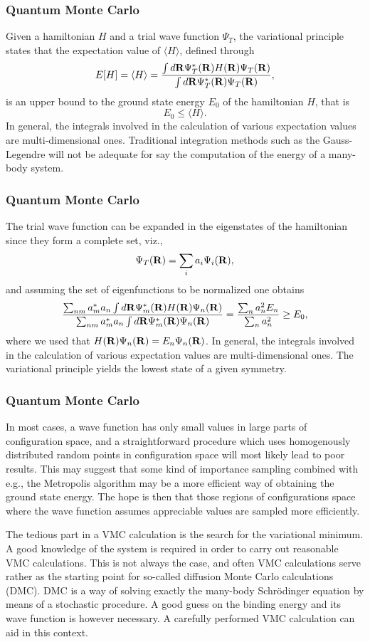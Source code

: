 \documentclass[compress]{beamer}
\begin{document}
\frame
{
  \frametitle{Quantum Monte Carlo}
\begin{small}
{\scriptsize
Given a hamiltonian $H$ and a trial
wave function $\Psi_T$, the variational principle states that
the expectation value of $\langle H \rangle$, defined through 
\[
   E[H]= \langle H \rangle =
   \frac{\int d{\bf R}\Psi^{\ast}_T({\bf R})H({\bf R})\Psi_T({\bf R})}
        {\int d{\bf R}\Psi^{\ast}_T({\bf R})\Psi_T({\bf R})},
\]
is an upper bound to the ground state energy $E_0$ of the hamiltonian $H$, that
is 
\[
    E_0 \le \langle H \rangle .
\]
In general, the integrals involved in the calculation of various  expectation
values  are multi-dimensional ones. Traditional integration methods
such as the Gauss-Legendre will not be adequate for say the 
computation of the energy of a many-body system.
}
\end{small}
}


\frame
{
  \frametitle{Quantum Monte Carlo}
\begin{small}
{\scriptsize
The trial wave function can be expanded
in the eigenstates of the hamiltonian since they form a complete set, viz.,
\[
   \Psi_T({\bf R})=\sum_i a_i\Psi_i({\bf R}),
\]
and assuming the set of eigenfunctions to be normalized one obtains 
\[
     \frac{\sum_{nm}a^*_ma_n \int d{\bf R}\Psi^{\ast}_m({\bf R})H({\bf R})\Psi_n({\bf R})}
        {\sum_{nm}a^*_ma_n \int d{\bf R}\Psi^{\ast}_m({\bf R})\Psi_n({\bf R})} =\frac{\sum_{n}a^2_n E_n}
        {\sum_{n}a^2_n} \ge E_0,
\]
where we used that $H({\bf R})\Psi_n({\bf R})=E_n\Psi_n({\bf R})$.
In general, the integrals involved in the calculation of various  expectation
values  are multi-dimensional ones. 
The variational principle yields the lowest state of a given symmetry.
}
\end{small}
}


\frame
{
  \frametitle{Quantum Monte Carlo}
\begin{small}
{\scriptsize
In most cases, a wave function has only small values in large parts of 
configuration space, and a straightforward procedure which uses
homogenously distributed random points in configuration space 
will most likely lead to poor results. This may suggest that some kind
of importance sampling combined with e.g., the Metropolis algorithm 
may be  a more efficient way of obtaining the ground state energy.
The hope is then that those regions of configurations space where
the wave function assumes appreciable values are sampled more 
efficiently. 

The tedious part in a VMC calculation is the search for the variational
minimum. A good knowledge of the system is required in order to carry out
reasonable VMC calculations. This is not always the case, 
and often VMC calculations 
serve rather as the starting
point for so-called diffusion Monte Carlo calculations (DMC). DMC is a way of
solving exactly the many-body Schr\"odinger equation by means of 
a stochastic procedure. A good guess on the binding energy
and its wave function is however necessary. 
A carefully performed VMC calculation can aid in this context. 
}
\end{small}
}
\end{document}
